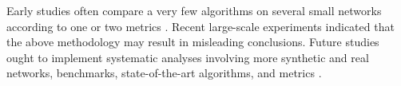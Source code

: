 Early studies often compare a very few algorithms on several small networks according to one or two metrics \cite{zhou2021progresses}. Recent large-scale experiments \cite{mara2020benchmarking, ghasemian2020stacking, muscoloni2022adaptive, muscoloni2021short, zhou2021experimental} indicated that the above methodology may result in misleading conclusions. Future studies ought to implement systematic analyses involving more synthetic and real networks, benchmarks, state-of-the-art algorithms, and metrics \cite{zhou2021progresses}.
